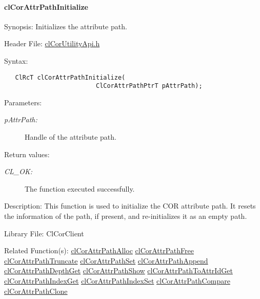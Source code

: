 \hypertarget{pagecor256}{}\paragraph{cl\-Cor\-Attr\-Path\-Initialize}\label{pagecor256}
\begin{Desc}
\item[Synopsis:]Initializes the attribute path.\end{Desc}
\begin{Desc}
\item[Header File:]\hyperlink{cl_cor_utility_api_8h}{cl\-Cor\-Utility\-Api.h}\end{Desc}
\begin{Desc}
\item[Syntax:]

\footnotesize\begin{verbatim}   ClRcT clCorAttrPathInitialize(
                         ClCorAttrPathPtrT pAttrPath);
\end{verbatim}
\normalsize
\end{Desc}
\begin{Desc}
\item[Parameters:]
\begin{description}
\item[{\em p\-Attr\-Path:}]Handle of the attribute path.\end{description}
\end{Desc}
\begin{Desc}
\item[Return values:]
\begin{description}
\item[{\em CL\_\-OK:}]The function executed successfully.\end{description}
\end{Desc}
\begin{Desc}
\item[Description:]This function is used to initialize the COR attribute path. It resets the information of the path, if present, and re-initializes it as an empty path.\end{Desc}
\begin{Desc}
\item[Library File:]Cl\-Cor\-Client\end{Desc}
\begin{Desc}
\item[Related Function(s):]\hyperlink{group__group13}{cl\-Cor\-Attr\-Path\-Alloc} \hyperlink{group__group13}{cl\-Cor\-Attr\-Path\-Free} \hyperlink{group__group13}{cl\-Cor\-Attr\-Path\-Truncate} \hyperlink{group__group13}{cl\-Cor\-Attr\-Path\-Set} \hyperlink{group__group13}{cl\-Cor\-Attr\-Path\-Append} \hyperlink{group__group13}{cl\-Cor\-Attr\-Path\-Depth\-Get} \hyperlink{group__group13}{cl\-Cor\-Attr\-Path\-Show} \hyperlink{group__group13}{cl\-Cor\-Attr\-Path\-To\-Attr\-Id\-Get} \hyperlink{group__group13}{cl\-Cor\-Attr\-Path\-Index\-Get} \hyperlink{group__group13}{cl\-Cor\-Attr\-Path\-Index\-Set} \hyperlink{group__group13}{cl\-Cor\-Attr\-Path\-Compare} \hyperlink{group__group13}{cl\-Cor\-Attr\-Path\-Clone} \end{Desc}
